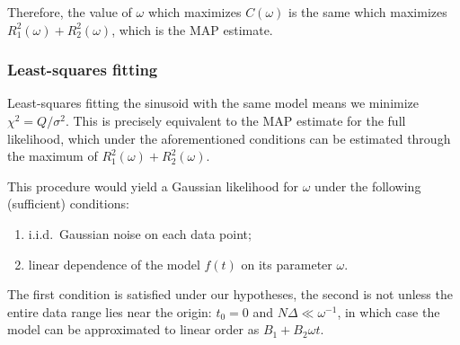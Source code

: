 \documentclass[main.tex]{subfiles}
\begin{document}
Therefore, the value of \(\omega \) which maximizes \(C(\omega )\) is the same which maximizes \(R_1^2 (\omega ) + R_2^2 (\omega )\), which is the MAP estimate. 

\subsubsection{Least-squares fitting}

Least-squares fitting the sinusoid with the same model means we minimize \(\chi^2 =  Q / \sigma^2\).
This is precisely equivalent to the MAP estimate for the full likelihood, which under the aforementioned conditions can be estimated through the maximum of \(R_1^2(\omega ) + R_2^2(\omega )\). 

This procedure would yield a Gaussian likelihood for \(\omega \) under the following (sufficient) conditions: 
\begin{enumerate}
    \item i.i.d.\ Gaussian noise on each data point;
    \item linear dependence of the model \(f(t)\) on its parameter \(\omega \).
\end{enumerate}

The first condition is satisfied under our hypotheses, the second is not unless the entire data range lies near the origin: \(t_0 = 0\) and \(N \Delta  \ll \omega^{-1}\), in which case the model can be approximated to linear order as \(B_1 + B_2 \omega t\). 
\end{document}
